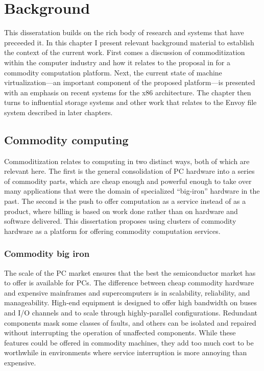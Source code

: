 \chapter{Background}\label{cha:background}

This disseratation builds on the rich body of research and systems that have preceeded it. In this chapter I present relevant background material to establish the context of the current work. First comes a discussion of commoditization within the computer industry and how it relates to the proposal in  for a commodity computation platform. Next, the current state of machine virtualization---an important component of the proposed platform---is presented with an emphasis on recent systems for the x86 architecture. The chapter then turns to influential storage systems and other work that relates to the Envoy file system described in later chapters.

\section{Commodity computing}

Commoditization relates to computing in two distinct ways, both of which are relevant here. The first is the general consolidation of PC hardware into a series of commodity parts, which are cheap enough and powerful enough to take over many applications that were the domain of specialized ``big-iron'' hardware in the past. The second is the push to offer computation as a service instead of as a product, where billing is based on work done rather than on hardware and software delivered. This dissertation proposes using clusters of commodity hardware as a platform for offering commodity computation services.

\subsection{Commodity big iron}

The scale of the PC market ensures that the best the semiconductor market has to offer is available for PCs. The difference between cheap commodity hardware and expensive mainframes and supercomputers is in scalability, reliability, and manageability. High-end equipment is designed to offer high bandwidth on buses and I/O channels and to scale through highly-parallel configurations. Redundant components mask some classes of faults, and others can be isolated and repaired without interrupting the operation of unaffected components. While these features could be offered in commodity machines, they add too much cost to be worthwhile in environments where service interruption is more annoying than expensive.

